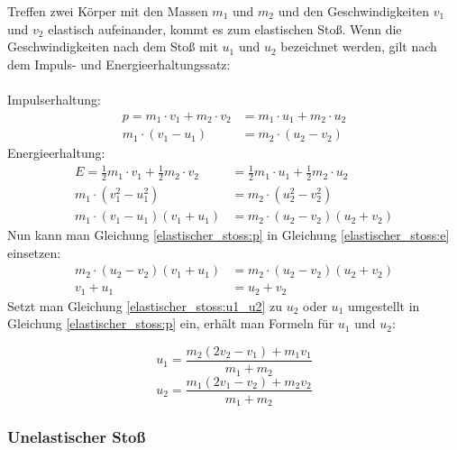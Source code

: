 \documentclass[a4paper]{article}
\begin{document}
				Treffen zwei Körper mit den Massen $m_1$ und $m_2$ und den Geschwindigkeiten $v_1$ und $v_2$ elastisch aufeinander, kommt es zum elastischen Stoß. Wenn die Geschwindigkeiten nach dem Stoß mit $u_1$ und $u_2$ bezeichnet werden, gilt nach dem Impuls- und Energieerhaltungssatz:\\\\
				Impulserhaltung:
				\begin{equation}\label{elastischer_stoss:p}
					\begin{aligned}
					p=m_1 \cdot v_1 + m_2 \cdot v_2 &= m_1 \cdot u_1 + m_2 \cdot u_2\\
					m_1 \cdot (v_1 - u_1) &= m_2 \cdot (u_2 - v_2)
					\end{aligned}
				\end{equation}
				Energieerhaltung:
				\begin{equation}\label{elastischer_stoss:e}
					\begin{aligned}
					E=\frac{1}{2}m_1 \cdot v_1 + \frac{1}{2}m_2 \cdot v_2 &= \frac{1}{2}m_1 \cdot u_1 + \frac{1}{2}m_2 \cdot u_2\\
					m_1 \cdot (v_1^2 - u_1^2) &= m_2 \cdot (u_2^2 - v_2^2)\\
						m_1 \cdot (v_1 - u_1)(v_1 + u_1)&= m_2 \cdot (u_2 - v_2)(u_2 + v_2)
					\end{aligned}
				\end{equation}
				Nun kann man Gleichung \ref{elastischer_stoss:p} in Gleichung \ref{elastischer_stoss:e} einsetzen:
				\begin{equation}\label{elastischer_stoss:u1_u2}
					\begin{aligned}
					m_2 \cdot (u_2 - v_2)(v_1 + u_1)&= m_2 \cdot (u_2 - v_2)(u_2 + v_2)\\
					v_1 + u_1&= u_2 + v_2
					\end{aligned}
				\end{equation}
				Setzt man Gleichung \ref{elastischer_stoss:u1_u2} zu $u_2$ oder $u_1$ umgestellt in Gleichung \ref{elastischer_stoss:p} ein, erhält man Formeln für $u_1$ und $u_2$:
				
				\begin{equation}
					u_1=\frac{m_2(2v_2 - v_1) + m_1v_1}{m_1+m_2}
				\end{equation}
				\begin{equation}
					u_2=\frac{m_1(2v_1 - v_2) + m_2v_2}{m_1+m_2}
				\end{equation}
	
			\subsubsection{Unelastischer Stoß}
			
\end{document}
